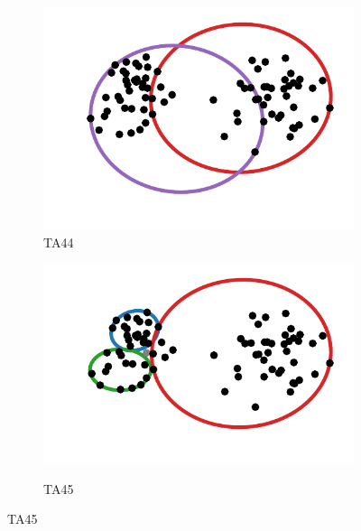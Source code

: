 \begin{figure}[!htb]
	\caption{Optimal solutions for instances TA44 and TA45.}
	\begin{subfigure}{.5\textwidth}
			\centering
		\caption{TA44}
		\includegraphics[scale=.6]{tex/figures/TA044}

		\label{fig:TA043}
	\end{subfigure}
	\begin{subfigure}{.5\textwidth}
			\centering
		\caption{TA45}
		\includegraphics[scale=.6]{tex/figures/TA045}
		\label{fig:TA044}
	\end{subfigure}
\label{fig:TA44-45}
	\fautor
\end{figure}
